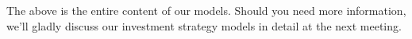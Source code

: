 \documentclass[12pt]{article}
\begin{document}
\vspace{0.1cm}
\noindent
The above is the entire content of our models. Should you need more information, we'll gladly discuss our investment strategy models in detail at the next meeting.

\vspace{0.1cm}
\noindent
{}

\clearpage
  

\end{document}
